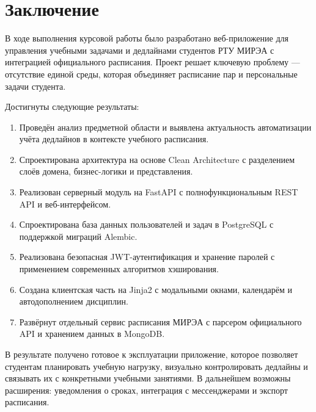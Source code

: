 \section*{Заключение}

В ходе выполнения курсовой работы было разработано веб-приложение для управления учебными задачами и дедлайнами студентов РТУ МИРЭА с интеграцией официального расписания. Проект решает ключевую проблему --- отсутствие единой среды, которая объединяет расписание пар и персональные задачи студента.

Достигнуты следующие результаты:
\begin{enumerate}
    \item Проведён анализ предметной области и выявлена актуальность автоматизации учёта дедлайнов в контексте учебного расписания.
    \item Спроектирована архитектура на основе Clean Architecture с разделением слоёв домена, бизнес-логики и представления.
    \item Реализован серверный модуль на FastAPI с полнофункциональным REST API и веб-интерфейсом.
    \item Спроектирована база данных пользователей и задач в PostgreSQL с поддержкой миграций Alembic.
    \item Реализована безопасная JWT-аутентификация и хранение паролей с применением современных алгоритмов хэширования.
    \item Создана клиентская часть на Jinja2 с модальными окнами, календарём и автодополнением дисциплин.
    \item Развёрнут отдельный сервис расписания МИРЭА с парсером официального API и хранением данных в MongoDB.
\end{enumerate}

В результате получено готовое к эксплуатации приложение, которое позволяет студентам планировать учебную нагрузку, визуально контролировать дедлайны и связывать их с конкретными учебными занятиями. В дальнейшем возможны расширения: уведомления о сроках, интеграция с мессенджерами и экспорт расписания.
